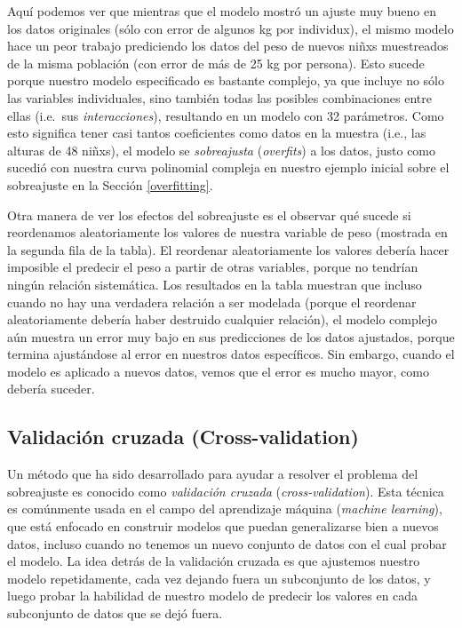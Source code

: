 \documentclass[
  12pt,
]{book}
\theoremstyle{definition}
\theoremstyle{definition}
\theoremstyle{definition}
\theoremstyle{remark}
\begin{document}
Aquí podemos ver que mientras que el modelo mostró un ajuste muy bueno en los datos originales (sólo con error de algunos kg por individux), el mismo modelo hace un peor trabajo prediciendo los datos del peso de nuevos niñxs muestreados de la misma población (con error de más de 25 kg por persona). Esto sucede porque nuestro modelo especificado es bastante complejo, ya que incluye no sólo las variables individuales, sino también todas las posibles combinaciones entre ellas (i.e.~sus \emph{interacciones}), resultando en un modelo con 32 parámetros. Como esto significa tener casi tantos coeficientes como datos en la muestra (i.e., las alturas de 48 niñxs), el modelo se \emph{sobreajusta} (\emph{overfits}) a los datos, justo como sucedió con nuestra curva polinomial compleja en nuestro ejemplo inicial sobre el sobreajuste en la Sección \ref{overfitting}.

Otra manera de ver los efectos del sobreajuste es el observar qué sucede si reordenamos aleatoriamente los valores de nuestra variable de peso (mostrada en la segunda fila de la tabla). El reordenar aleatoriamente los valores debería hacer imposible el predecir el peso a partir de otras variables, porque no tendrían ningún relación sistemática. Los resultados en la tabla muestran que incluso cuando no hay una verdadera relación a ser modelada (porque el reordenar aleatoriamente debería haber destruido cualquier relación), el modelo complejo aún muestra un error muy bajo en sus predicciones de los datos ajustados, porque termina ajustándose al error en nuestros datos específicos. Sin embargo, cuando el modelo es aplicado a nuevos datos, vemos que el error es mucho mayor, como debería suceder.

\hypertarget{cross-validation}{%
\subsection{Validación cruzada (Cross-validation)}\label{cross-validation}}

Un método que ha sido desarrollado para ayudar a resolver el problema del sobreajuste es conocido como \emph{validación cruzada} (\emph{cross-validation}). Esta técnica es comúnmente usada en el campo del aprendizaje máquina (\emph{machine learning}), que está enfocado en construir modelos que puedan generalizarse bien a nuevos datos, incluso cuando no tenemos un nuevo conjunto de datos con el cual probar el modelo. La idea detrás de la validación cruzada es que ajustemos nuestro modelo repetidamente, cada vez dejando fuera un subconjunto de los datos, y luego probar la habilidad de nuestro modelo de predecir los valores en cada subconjunto de datos que se dejó fuera.
\end{document}
